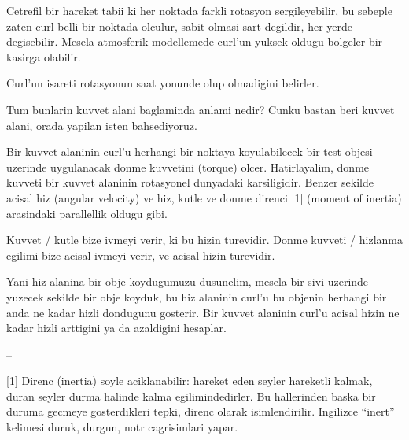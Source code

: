 \documentclass[12pt,fleqn]{article}
\begin{document}
Cetrefil bir hareket tabii ki her noktada farkli rotasyon sergileyebilir,
bu sebeple zaten curl belli bir noktada olculur, sabit olmasi sart
degildir, her yerde degisebilir. Mesela atmosferik modellemede curl'un
yuksek oldugu bolgeler bir kasirga olabilir. 

Curl'un isareti rotasyonun saat yonunde olup olmadigini belirler. 

Tum bunlarin kuvvet alani baglaminda anlami nedir? Cunku bastan beri kuvvet
alani, orada yapilan isten bahsediyoruz. 

Bir kuvvet alaninin curl'u herhangi bir noktaya koyulabilecek bir test
objesi uzerinde uygulanacak donme kuvvetini (torque) olcer. Hatirlayalim,
donme kuvveti bir kuvvet alaninin rotasyonel dunyadaki karsiligidir. Benzer
sekilde acisal hiz (angular velocity) ve hiz, kutle ve donme direnci [1]
(moment of inertia) arasindaki parallellik oldugu gibi. 

Kuvvet / kutle bize ivmeyi verir, ki bu hizin turevidir. Donme kuvveti /
hizlanma egilimi bize acisal ivmeyi verir, ve acisal hizin turevidir. 

Yani hiz alanina bir obje koydugumuzu dusunelim, mesela bir sivi uzerinde
yuzecek sekilde bir obje koyduk, bu hiz alaninin curl'u bu objenin herhangi
bir anda ne kadar hizli dondugunu gosterir. Bir kuvvet alaninin curl'u
acisal hizin ne kadar hizli arttigini ya da azaldigini hesaplar.

--

[1] Direnc (inertia) soyle aciklanabilir: hareket eden seyler hareketli
kalmak, duran seyler durma halinde kalma egilimindedirler. Bu hallerinden
baska bir duruma gecmeye gosterdikleri tepki, direnc olarak
isimlendirilir. Ingilizce ``inert'' kelimesi duruk, durgun, notr
cagrisimlari yapar. 
\end{document}
